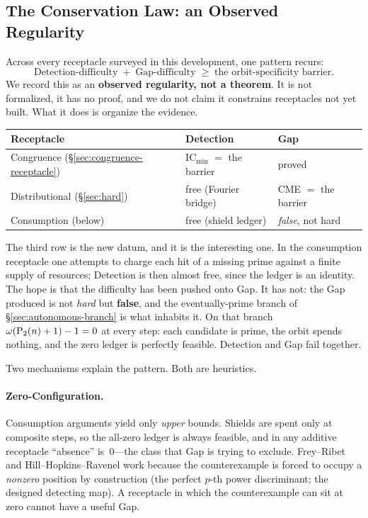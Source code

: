 \subsection{The Conservation Law: an Observed Regularity}
\label{sec:conservation}

Across every receptacle surveyed in this development, one pattern
recurs:
\[
  \text{Detection-difficulty} \;+\; \text{Gap-difficulty}
  \;\geq\; \text{the orbit-specificity barrier.}
\]
We record this as an \textbf{observed regularity, not a theorem}.  It
is not formalized, it has no proof, and we do not claim it constrains
receptacles not yet built.  What it does is organize the evidence.

\smallskip
\begin{center}
\begin{tabular}{@{}l@{\quad}l@{\quad}l@{}}
\toprule
\textbf{Receptacle} & \textbf{Detection} & \textbf{Gap} \\
\midrule
Congruence (\S\ref{sec:congruence-receptacle})
  & $\mathrm{IC}_{\min}$ $=$ the barrier
  & proved \\
Distributional (\S\ref{sec:hard})
  & free (Fourier bridge)
  & CME $=$ the barrier \\
Consumption (below)
  & free (shield ledger)
  & \emph{false}, not hard \\
\bottomrule
\end{tabular}
\end{center}

\smallskip\noindent
The third row is the new datum, and it is the interesting one.  In the
consumption receptacle one attempts to charge each hit of a missing
prime against a finite supply of resources; Detection is then almost
free, since the ledger is an identity.  The hope is that the
difficulty has been pushed onto Gap.  It has not: the Gap produced is
not \emph{hard} but \textbf{false}, and the eventually-prime branch of
\S\ref{sec:autonomous-branch} is what inhabits it.  On that branch
$\omega(\mathrm{P}_{2}(n)+1) - 1 = 0$ at every step: each candidate is
prime, the orbit spends nothing, and the zero ledger is perfectly
feasible.  Detection and Gap fail together.

Two mechanisms explain the pattern.  Both are heuristics.

\paragraph{Zero-Configuration.}
Consumption arguments yield only \emph{upper} bounds.  Shields are
spent only at composite steps, so the all-zero ledger is always
feasible, and in any additive receptacle ``absence'' is~$0$---the
class that Gap is trying to exclude.  Frey--Ribet and
Hill--Hopkins--Ravenel work because the counterexample is forced to
occupy a \emph{nonzero} position by construction (the perfect $p$-th
power discriminant; the designed detecting map).  A receptacle in
which the counterexample can sit at zero cannot have a useful Gap.

